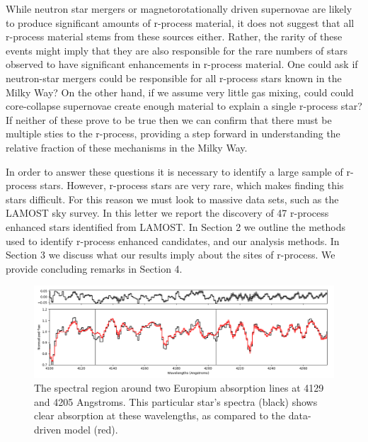 \documentclass[a4paper,fleqn,usenatbib]{mnras}
\begin{document}
	While neutron star mergers or magnetorotationally driven supernovae are likely to produce significant amounts of r-process material, it does not suggest that all r-process material stems from these sources either. Rather, the rarity of these events might imply that they are also responsible for the rare numbers of stars  observed to have significant enhancements in r-process material. One could ask if neutron-star mergers could be responsible for all r-process stars known in the Milky Way? On the other hand, if we assume very little gas mixing, could could core-collapse supernovae create enough material to explain a single r-process star? If neither of these prove to be true then we can confirm that there must be multiple sties to the r-process, providing a step forward in understanding the relative fraction of these mechanisms in the Milky Way.
	
	In order to answer these questions it is necessary to identify a large sample of r-process stars.
	 However, r-process stars are very rare, which makes finding this stars difficult. For this reason we must look to massive data sets, such as the LAMOST sky survey. In this letter we report the discovery of 47 r-process enhanced stars identified from LAMOST.
	In Section 2 we outline the methods used to identify r-process enhanced candidates, and our analysis methods. In Section 3 we discuss what our results imply about the sites of r-process. We provide concluding remarks in Section 4.
	
	
	\begin{figure}
		\includegraphics[width=\columnwidth]{423451}
		\caption{The spectral region around two Europium absorption lines at 4129 and 4205 Angstroms. This particular star's spectra (black) shows clear absorption at these wavelengths, as compared to the data-driven model (red).}
		\label{fig:starindex_423451}
	\end{figure}
	
\end{document}
